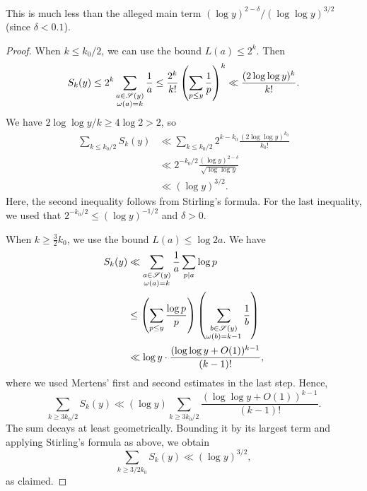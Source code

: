 This is much less than the alleged main term $(\log y)^{2 - \delta} / (\log \log y)^{3/2}$ (since \mbox{$\delta < 0.1$}).

\begin{proof}
    When $k \le k_0/2$, we can use the bound $L(a) \le 2^k$. 
    Then 
    \begin{equation*}
        S_k(y) \le 2^k \sum \limits_{\substack{a \in \mathscr{S}(y) \\\omega(a) = k}} \frac{1}{a} \le \frac{2^k}{k!} \left( \sum \limits_{p \le y} \frac{1}{p} \right)^k \ll \frac{(2 \log \log y)^k}{k!}.
    \end{equation*}
    We have $2 \log \log y /k \ge 4 \log 2 > 2$, so
    \begin{align*}
        \sum \limits_{k \le k_0/2} S_k(y) &\ll \sum \limits_{k \le k_0/2} 2^{k - k_0} \frac{{(2 \log \log y)}^{k_0}}{k_0!} \\ 
        &\ll 2^{-k_0/2} \frac{(\log y)^{2 - \delta}}{\sqrt{\log \log y}} \\
        &\ll (\log y)^{3/2}.
    \end{align*}
    Here, the second inequality follows from Stirling's formula. 
    For the last inequality, we used that $2^{-k_0/2} \le (\log y)^{-1/2}$ and $\delta > 0$.

    When $k \ge \frac{3}{2}k_0$, we use the bound $L(a) \le \log 2a$.
    We have
    \begin{align*}
        S_k(y) &\ll \sum\limits_{\substack{a \in \mathscr{S}(y) \\\omega(a) = k}} \frac{1}{a} \sum \limits_{p \mid a} \log p \\ 
            &\le \left(\sum \limits_{p \le y} \frac{\log p}{p}\right) \left(\sum \limits_{\substack{b \in \mathscr{S}(y)\\ \omega(b) = k - 1}} \frac{1}{b} \right) \\ 
            &\ll \log y \cdot \frac{(\log \log y + O(1))^{k - 1}}{(k - 1)!},
    \end{align*}
    where we used Mertens' first and second estimates in the last step.
    Hence, 
    \begin{equation*}
        \sum \limits_{k \ge 3k_0 / 2} S_k(y) \ll (\log y) \sum \limits_{k \ge 3k_0/ 2} \frac{(\log \log y + O(1))^{k - 1}}{(k - 1)!}.
    \end{equation*}
    The sum decays at least geometrically.
    Bounding it by its largest term and applying Stirling's formula as above, we obtain 
    \begin{equation*}
        \sum \limits_{k \ge 3/2 k_0} S_k(y) \ll (\log y)^{3/2},
    \end{equation*}
    as claimed.
\end{proof}

